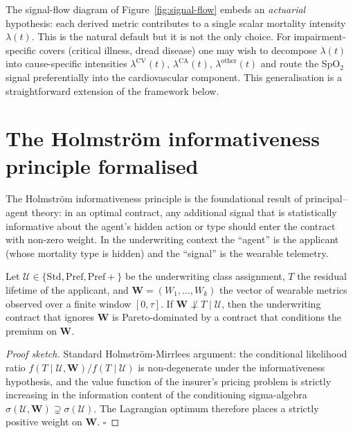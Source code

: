\begin{rbox}
The signal-flow diagram of Figure~\ref{fig:signal-flow} embeds an
\emph{actuarial} hypothesis: each derived metric contributes to a
single scalar mortality intensity $\lambda(t)$. This is the natural
default but it is not the only choice. For impairment-specific covers
(critical illness, dread disease) one may wish to decompose
$\lambda(t)$ into cause-specific intensities $\lambda^{\mathrm{CV}}(t)$,
$\lambda^{\mathrm{CA}}(t)$, $\lambda^{\mathrm{other}}(t)$ and route the
SpO$_2$ signal preferentially into the cardiovascular component. This
generalisation is a straightforward extension of the framework below.
\end{rbox}

\section{The Holmstr\"om informativeness principle formalised}\label{sec:holmstrom}

The Holmstr\"om informativeness principle \citep{Holmstrom1979} is the
foundational result of principal--agent theory: in an optimal contract,
any additional signal that is statistically informative about the
agent's hidden action or type should enter the contract with non-zero
weight. In the underwriting context the ``agent'' is the applicant
(whose mortality type is hidden) and the ``signal'' is the wearable
telemetry.

\begin{proposition}\label{prop:holmstrom}
Let $\mathcal{U}\in\{\mathrm{Std},\mathrm{Pref},\mathrm{Pref+}\}$ be
the underwriting class assignment, $T$ the residual lifetime of the
applicant, and $\mathbf{W}=(W_1,\dots,W_k)$ the vector of wearable
metrics observed over a finite window $[0,\tau]$. If
$\mathbf{W}\not\perp T \mid \mathcal{U}$, then the underwriting
contract that ignores $\mathbf{W}$ is Pareto-dominated by a contract
that conditions the premium on $\mathbf{W}$.
\end{proposition}

\begin{proof}[Proof sketch] Standard Holmstr\"om-Mirrlees argument:
the conditional likelihood ratio
$f(T\mid\mathcal{U},\mathbf{W})/f(T\mid\mathcal{U})$ is non-degenerate
under the informativeness hypothesis, and the value function of the
insurer's pricing problem is strictly increasing in the information
content of the conditioning sigma-algebra
$\sigma(\mathcal{U},\mathbf{W}) \supsetneq \sigma(\mathcal{U})$.
The Lagrangian optimum therefore places a strictly positive weight on
$\mathbf{W}$. $\square$
\end{proof}

